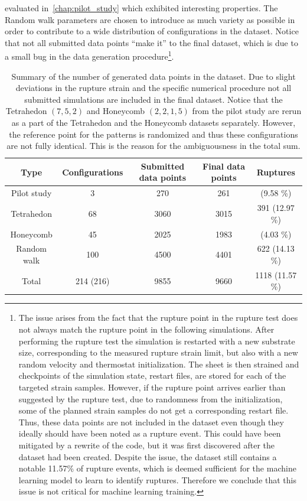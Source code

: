 evaluated in~\cref{chap:pilot_study} which exhibited interesting properties. The
Random walk parameters are chosen to introduce as much
variety as possible in order to contribute to a wide distribution of configurations in the dataset. Notice that not all
submitted data points ``make it'' to the final dataset, which is due to a small
bug in the data generation procedure\footnote{The issue arises from the fact
that the rupture point in the rupture test does not always match the rupture
point in the following simulations. After performing the rupture test the
simulation is restarted with a new substrate size, corresponding to the measured
rupture strain limit, but also with a new random velocity and thermostat
initialization. The sheet is then strained and checkpoints of the simulation
state, restart files, are stored for each of the targeted strain samples.
However, if the rupture point arrives earlier than suggested by the rupture
test, due to randomness from the initialization, some of the planned strain
samples do not get a corresponding restart file. Thus, these data points are
not included in the dataset even though they ideally should have been noted as a
rupture event. This could have been mitigated by a rewrite of the code, but it
was first discovered after the dataset had been created. Despite the issue, the
dataset still contains a notable 11.57\% of rupture events, which is deemed
sufficient for the machine learning model to learn to identify ruptures.
Therefore we conclude that this issue is not critical for machine learning
training.}.


\begin{table}[!htb]
  \begin{center}
  \caption{Summary of the number of generated data points in the dataset. Due to slight deviations in the rupture strain and the specific numerical procedure not all submitted simulations are included in the final dataset. Notice that the Tetrahedon $(7, 5, 2)$ and Honeycomb $(2, 2, 1, 5)$ from the pilot study are rerun as a part of the Tetrahedon and the Honeycomb datasets separately. However, the reference point for the patterns is randomized and thus these configurations are not fully identical. This is the reason for the ambiguousness in the total sum.}
  \label{tab:dataset_summary}
  \begin{tabular}{ | c | c | c | c | c |} \hline
  \textbf{Type} & \textbf{Configurations} & \textbf{Submitted data points} & \textbf{Final data points} & \textbf{Ruptures} \\ \hline
  Pilot study & 3 & 270 & 261 & \: 25 \: (9.58 \%)\\ \hline
  Tetrahedon & 68 & 3060 & 3015 & 391 (12.97 \%)\\ \hline
  Honeycomb & 45 & 2025 & 1983 & \: 80 \: (4.03 \%)\\ \hline
  Random walk & 100 & 4500 & 4401 & 622 (14.13 \%) \\ \Xhline{2\arrayrulewidth}
  Total & 214 (216) & 9855 & 9660 & 1118 (11.57 \%) \\ \hline
  \end{tabular}
  \end{center}
\end{table}


